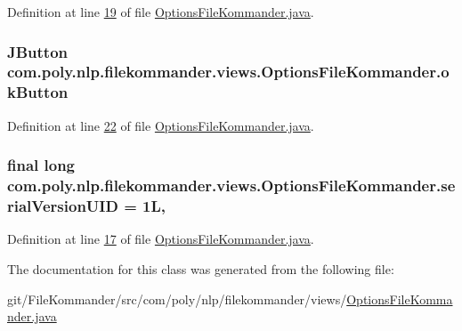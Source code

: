 Definition at line \hyperlink{L19}{19} of file \hyperlink{}{Options\-File\-Kommander.\-java}.

\hypertarget{classcom_1_1poly_1_1nlp_1_1filekommander_1_1views_1_1_options_file_kommander_a0f8aef931bc85b51505210be4fbc87e1}{
\subsubsection[{ok\-Button}]{\setlength{\rightskip}{0pt plus 5cm}J\-Button com.\-poly.\-nlp.\-filekommander.\-views.\-Options\-File\-Kommander.\-ok\-Button\hspace{0.3cm}{\ttfamily [private]}}}\label{classcom_1_1poly_1_1nlp_1_1filekommander_1_1views_1_1_options_file_kommander_a0f8aef931bc85b51505210be4fbc87e1}


Definition at line \hyperlink{L22}{22} of file \hyperlink{}{Options\-File\-Kommander.\-java}.

\hypertarget{classcom_1_1poly_1_1nlp_1_1filekommander_1_1views_1_1_options_file_kommander_aa50f9fa645b0df5ee340104231031857}{
\subsubsection[{serial\-Version\-U\-I\-D}]{\setlength{\rightskip}{0pt plus 5cm}final long com.\-poly.\-nlp.\-filekommander.\-views.\-Options\-File\-Kommander.\-serial\-Version\-U\-I\-D = 1\-L\hspace{0.3cm}{\ttfamily [static]}, {\ttfamily [private]}}}\label{classcom_1_1poly_1_1nlp_1_1filekommander_1_1views_1_1_options_file_kommander_aa50f9fa645b0df5ee340104231031857}


Definition at line \hyperlink{L17}{17} of file \hyperlink{}{Options\-File\-Kommander.\-java}.



The documentation for this class was generated from the following file\-:\begin{DoxyCompactItemize}
\item 
git/\-File\-Kommander/src/com/poly/nlp/filekommander/views/\hyperlink{_options_file_kommander_8java}{Options\-File\-Kommander.\-java}\end{DoxyCompactItemize}
